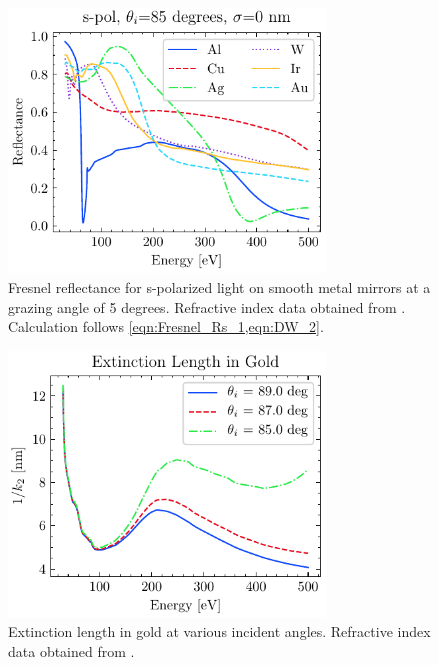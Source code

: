 \begin{figure}
	\centering
	\includegraphics[width=0.75\textwidth]{figures/chap2/Fresnel_NoSigma.pdf}
	\caption{Fresnel reflectance for s-polarized light on smooth metal mirrors at a grazing angle of 5 degrees. Refractive index data obtained from \cite{gulliksonCXROXRayInteractions,henkeXRayInteractionsPhotoabsorption1993}. Calculation follows \cref{eqn:Fresnel_Rs_1,eqn:DW_2}.}
	\label{fig:Mirror_Material_Choice}
\end{figure}

\begin{figure}
	\centering
	\includegraphics[width=0.75\textwidth]{figures/chap2/Au_ExtinctionLength.pdf}
	\caption{Extinction length in gold at various incident angles. Refractive index data obtained from \cite{gulliksonCXROXRayInteractions,henkeXRayInteractionsPhotoabsorption1993}.}
	\label{fig:Au_Extinction_Length}
\end{figure}

